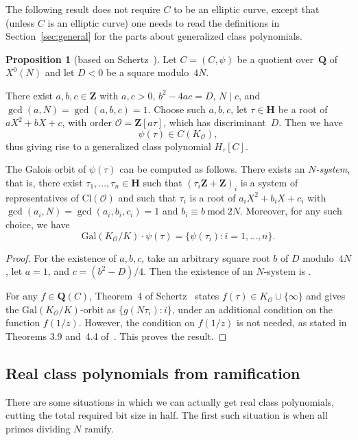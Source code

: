 \documentclass{amsart}
\newcommand{\QQ}{\mathbf{Q}}
\newcommand{\HH}{\mathbf{H}}
\newcommand{\ZZ}{\mathbf{Z}}
\newcommand{\Gal}{\mathrm{Gal}}
\newcommand{\Cl}{\mathrm{Cl}}
\newcommand{\mc}{\mathcal}
\newcommand{\xnul}[1]{X^0(#1)}
\newcommand{\xnulN}{\xnul{N}}
\numberwithin{equation}{section}
\theoremstyle{definition}
\newtheorem{proposition}[equation]{Proposition}
\begin{document}
The following result does not require $C$ to
be an elliptic curve, except that (unless $C$ is an elliptic curve)
one needs to read
the definitions in Section~\ref{sec:general}
for the parts about generalized class polynomials.
\begin{proposition}[based on Schertz~\cite{schertz2002weber}]\label{prop:Nsystem}
Let $C = (C, \psi)$ be a quotient over~$\QQ$ of $\xnulN$
and let $D<0$ be a square modulo~$4N$.

There exist $a,b,c\in\ZZ$ with $a,c>0$,
$b^2-4ac = D$, $N\mid c$, and $\gcd(a,N) = \gcd(a,b,c) = 1$.
Choose such $a, b,c$,
let $\tau\in\HH$ be a root of $aX^2 + bX + c$,
with order
$\mc{O} = \ZZ[a\tau]$, which
has discriminant~$D$.
Then we have $$\psi(\tau)\in C(K_{\mathcal{O}}),$$
thus giving rise to a generalized class polynomial $H_{\tau}[C]$.

The Galois orbit of $\psi(\tau)$ can be computed
as follows.
There exists an \emph{$N$-system}, that is,
there exist $\tau_1,\ldots, \tau_n\in\HH$ such that
$(\tau_i\ZZ+\ZZ)_i$ is a system of representatives of $\Cl(\mc{O})$
and such that $\tau_i$ is a root of $a_iX^2 + b_iX + c_i$
with $\gcd(a_i,N) = \gcd(a_i,b_i,c_i)=1$ and
$b_i\equiv b\ \mathrm{mod}\ 2N$.
Moreover, for any such choice, we have
$$\Gal(K_{\mc{O}}/K)\cdot \psi(\tau) = \{\psi(\tau_i) : i=1,\ldots,n\}.$$ 
\end{proposition}
\begin{proof}
	For the existence of $a,b,c$, take an arbitrary square root $b$
	of $D$ modulo~$4N$, let $a=1$, and $c= (b^2-D)/4$.
	Then the existence of an $N$-system is \cite[Proposition~3]{schertz2002weber}.
	
	For any $f\in \QQ(C)$,
	Theorem~4 of Schertz~\cite{schertz2002weber}
	states $f(\tau) 
	\in K_{\mc{O}}\cup\{\infty\}$ and gives
	the $\Gal(K_{\mc{O}}/K)$-orbit as
	$\{g(N\tau_i) : i\}$,
	under an additional condition on the function $f(1/z)$.
	However, the condition on $f(1/z)$ is not
	needed, as stated in Theorems 3.9 and~4.4 of~\cite{enge-streng}.
    This proves the result.
\end{proof}


\subsection{Real class polynomials from ramification}
\label{ssec:x0nramified}

There are some situations in which we can actually get real
class polynomials, cutting the total required bit size in half.
The first such situation is when all primes dividing $N$
ramify.
\end{document}
